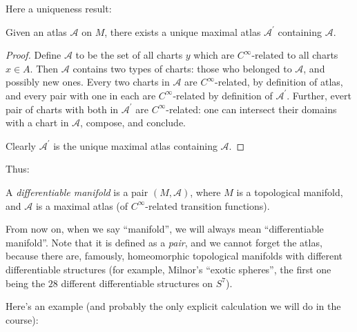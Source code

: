 \documentclass[11pt, english]{article}
\begin{document}
Here a uniqueness result:

\begin{lemma}
Given an atlas $\mathscr{A}$ on $M$, there exists a unique maximal atlas $\mathscr{A}^\prime$ containing $\mathscr A$.
\end{lemma}
\begin{proof}
Define $\mathscr A$ to be the set of all charts $y$ which are $C^\infty$-related to all charts $x \in A$. Then $\mathscr A$ contains two types of charts: those who belonged to $\mathscr A$, and possibly new ones. Every two charts in $\mathscr A$ are $C^\infty$-related, by definition of atlas, and every pair with one in each are $C^\infty$-related by definition of $\mathscr A^\prime$. Further, evert pair of charts with both in $\mathscr A^\prime$ are $C^\infty$-related: one can intersect their domains with a chart in $\mathscr A$, compose, and conclude.

Clearly $\mathscr A^\prime$ is the unique maximal atlas containing $\mathscr A$.
\end{proof}

Thus:

\begin{defi}
A \emph{differentiable manifold} is a pair $(M,\mathscr A)$, where $M$ is a topological manifold, and $\mathscr A$ is a maximal atlas (of $C^\infty$-related transition functions).
\end{defi}

From now on, when we say ``manifold'', we will always mean ``differentiable manifold''. Note that it is defined as a \emph{pair}, and we cannot forget the atlas, because there are, famously, homeomorphic topological manifolds with different differentiable structures (for example, Milnor's ``exotic spheres'', the first one being the $28$ different differentiable structures on $S^7$).

Here's an example (and probably the only explicit calculation we will do in the course):
\end{document}
